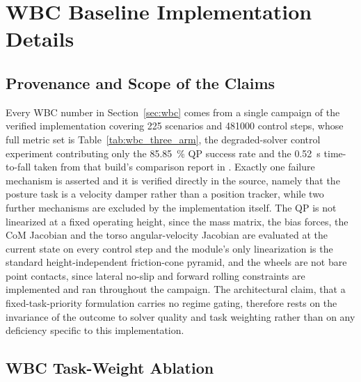 \documentclass[a4paper,fleqn]{cas-dc}
\begin{document}
\section{WBC Baseline Implementation Details}
\label{sec:wbc_supp}

\subsection{Provenance and Scope of the Claims}

Every WBC number in Section~\ref{sec:wbc} comes from a single campaign of the
verified implementation covering \num{225} scenarios and \num{481000} control
steps, whose full metric set is Table~\ref{tab:wbc_three_arm}, the
degraded-solver control experiment contributing only the \SI{85.85}{\percent} QP
success rate and the \SI{0.52}{s} time-to-fall taken from that build's comparison
report in . Exactly
one failure mechanism is asserted and it is verified directly in the source,
namely that the posture task is a velocity damper rather than a position tracker,
while two further mechanisms are excluded by the implementation itself. The QP is
not linearized at a fixed operating height, since the mass matrix, the bias
forces, the CoM Jacobian and the torso angular-velocity Jacobian are evaluated at
the current state on every control step and the module's only linearization is
the standard height-independent friction-cone pyramid, and the wheels are not
bare point contacts, since lateral no-slip and forward rolling constraints are
implemented and ran throughout the campaign. The architectural claim, that a
fixed-task-priority formulation carries no regime gating, therefore rests on the
invariance of the outcome to solver quality and task weighting rather than on any
deficiency specific to this implementation.

\subsection{WBC Task-Weight Ablation}
\end{document}
